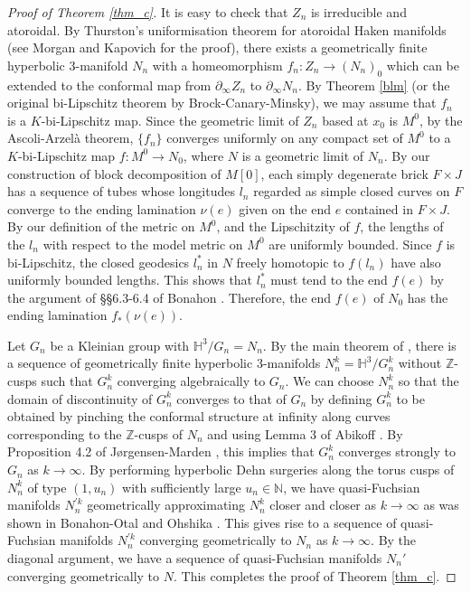 \documentclass{amsart}
\theoremstyle{definition}
\numberwithin{figure}{section}
\numberwithin{equation}{section}
\newcommand{\blackboard}[1]{\ensuremath{\mathbb{#1}}}
\newcommand{\hyperbolic}{\blackboard{H}}
\newcommand{\integers}{\blackboard{Z}} %
\newcommand{\naturals}{\blackboard{N}}
\def\zz{\integers}
\def\nn{\naturals}
\def\part{\partial}
\begin{document}
\begin{proof}[Proof of Theorem \ref{thm_c}]
It is easy to check that $Z_n$ is irreducible and atoroidal.
By Thurston's uniformisation theorem for atoroidal Haken manifolds \cite{th2} 
(see Morgan \cite{Mo} and Kapovich \cite{ka} for the proof), there exists a geometrically finite hyperbolic 3-manifold $N_n$ 
with a homeomorphism $f_n: Z_n\rightarrow (N_n)_0$ which can be extended to 
the conformal map from $\part_\infty Z_n$ to $\part_\infty N_n$.
By Theorem \ref{blm} (or the original bi-Lipschitz theorem by Brock-Canary-Minsky), we may assume that $f_n$ is a $K$-bi-Lipschitz map.
Since the geometric limit of $Z_n$ based at $x_0$ is $M^0$, by the Ascoli-Arzel\`{a} theorem, $\{f_n\}$ 
converges uniformly on any compact  set of $M^0$ to a $K$-bi-Lipschitz map $f:M^0 \rightarrow N_0$, 
where $N$ is a geometric limit of $N_n$.
By our construction of block decomposition of $M[0]$,  each simply degenerate brick $F\times J$ has a sequence of tubes whose longitudes $l_n$ regarded as simple closed curves on  $F$ converge to the ending lamination $\nu(e)$ given on the end $e$ contained in $F \times J$.
By our definition of the metric on $M^0$, and the Lipschitzity of $f$, the lengths of the $l_n$ with respect to the model metric on $M^0$ are uniformly bounded.
Since $f$ is bi-Lipschitz, the closed geodesics $l_n^*$ in $N$ freely homotopic to $f(l_n)$ have also uniformly bounded 
lengths.
This shows that $l_n^*$ must  tend to the end $f(e)$ by the argument of \S\S6.3-6.4 of Bonahon \cite{bon}.
Therefore, the end $f(e)$ of $N_0$ has the ending lamination $f_*(\nu(e))$.


Let $G_n$ be a Kleinian group with $\hyperbolic^3/G_n=N_n$.
By the main theorem of \cite{OhE}, there is a sequence of geometrically finite hyperbolic $3$-manifolds $N^k_n=\hyperbolic^3/G^k_n$ without $\integers$-cusps such that $G_n^k$ converging algebraically to $G_n$.
We can choose $N^k_n$ so that the domain of discontinuity of $G^k_n$ converges to that of $G_n$ by defining $G_n^k$ to be obtained by pinching the conformal structure at infinity along curves corresponding to the $\integers$-cusps of $N_n$ and using Lemma 3 of Abikoff \cite{Ab}.
By Proposition 4.2 of J{\o}rgensen-Marden \cite{jm}, this implies that $G^k_n$ converges strongly to $G_n$ as $k \rightarrow \infty$.
By performing hyperbolic Dehn surgeries along the torus cusps of $N_n^{k}$ of type $(1,u_n)$ with sufficiently large $u_n\in\nn$, we have quasi-Fuchsian manifolds $N_n^{'k}$ geometrically approximating $N_n^{k}$ closer and closer  as $k \rightarrow \infty$ as was shown in Bonahon-Otal \cite{BO} and Ohshika \cite{oh1}.
This gives rise to a sequence of  quasi-Fuchsian manifolds $N_n^{'k}$ converging geometrically to $N_n$ as $k \rightarrow \infty$.
By the diagonal argument, we have a sequence of quasi-Fuchsian manifolds $N_n'$ converging geometrically to $N$.
This completes the proof of Theorem \ref{thm_c}.
\end{proof}
\end{document}
